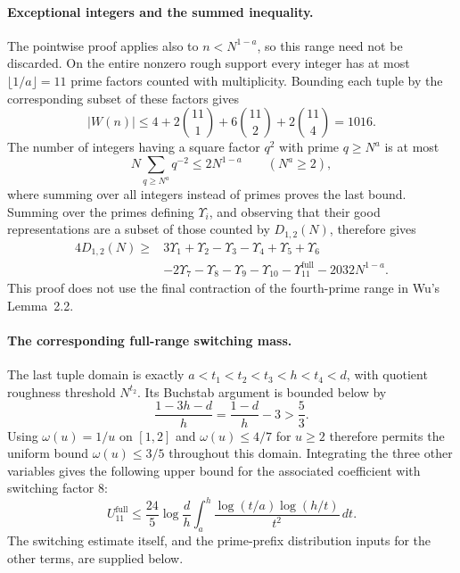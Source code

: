\documentclass[11pt]{article}
\begin{document}
\paragraph{Exceptional integers and the summed inequality.}
The pointwise proof applies also to $n<N^{1-a}$, so this range need
not be discarded. On the entire nonzero rough support every integer
has at most $\lfloor1/a\rfloor=11$ prime factors counted with
multiplicity. Bounding each tuple by the corresponding subset of
these factors gives
\[
 |W(n)|\le 4+2\binom{11}{1}+6\binom{11}{2}
                     +2\binom{11}{4}=1016.
\]
The number of integers having a square factor $q^2$ with prime
$q\ge N^a$ is at most
\[
 N\sum_{q\ge N^a}q^{-2}\le2N^{1-a}\qquad(N^a\ge2),
\]
where summing over all integers instead of primes proves the last
bound. Summing over the primes defining $\Upsilon_i$, and observing
that their good representations are a subset of those counted by
$D_{1,2}(N)$, therefore gives
\begin{align*}
4D_{1,2}(N)\ge{}&3\Upsilon_1+\Upsilon_2-\Upsilon_3-\Upsilon_4
 +\Upsilon_5+\Upsilon_6\\
 &-2\Upsilon_7-\Upsilon_8-\Upsilon_9-\Upsilon_{10}
   -\Upsilon_{11}^{\mathrm{full}}-2032N^{1-a}.
\end{align*}
This proof does not use the final contraction of the fourth-prime range
in Wu's Lemma~2.2.

\paragraph{The corresponding full-range switching mass.}
The last tuple domain is exactly
$a<t_1<t_2<t_3<h<t_4<d$, with quotient roughness threshold $N^{t_2}$.
Its Buchstab argument is bounded below by
\[
 \frac{1-3h-d}{h}=\frac{1-d}{h}-3>\frac53.
\]
Using $\omega(u)=1/u$ on $[1,2]$ and $\omega(u)\le4/7$ for $u\ge2$
therefore permits the uniform bound $\omega(u)\le3/5$ throughout this
domain. Integrating the three other variables gives the following upper
bound for the associated coefficient with switching factor $8$:
\[
 U_{11}^{\mathrm{full}}\le
 \frac{24}{5}\log\frac dh
 \int_a^h \frac{\log(t/a)\log(h/t)}{t^2}\,dt.
\]
The switching estimate itself, and the prime-prefix distribution inputs
for the other terms, are supplied below.
\end{document}
